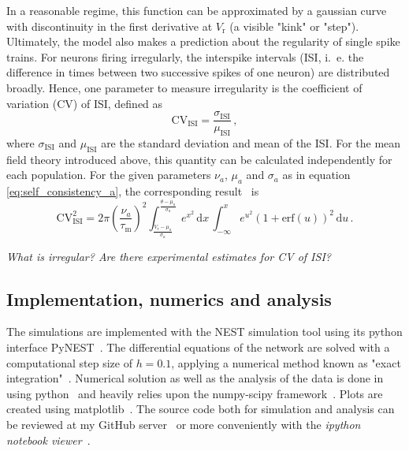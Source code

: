 In a reasonable regime, this function can be approximated by a gaussian curve with discontinuity in the first 
derivative at $V_\text{r}$ (a visible "kink" or "step").
Ultimately, the model also makes a prediction about the regularity of single spike 
trains. For neurons firing irregularly, the interspike intervals
(ISI, i.~e. the difference in times between two successive spikes of one neuron) 
are distributed broadly. Hence, one parameter to measure irregularity is the coefficient 
of variation (CV) of ISI, defined as
\begin{equation}
    \text{CV}_\text{ISI} = \frac{\sigma_\text{ISI}}{\mu_\text{ISI}} \,,
    \label{eq:cv_isi}
\end{equation}
where $\sigma_\text{ISI}$ and $\mu_\text{ISI}$ are the standard deviation and mean of 
the ISI. For the mean field theory introduced above, this quantity can be calculated
independently for each population. For the given parameters $\nu_a$, $\mu_a$ and 
$\sigma_a$ as in equation \eqref{eq:self_consistency_a}, the corresponding 
result~\cite{brunel2000} is
\begin{equation}
    \text{CV}_\text{ISI}^2 
        = 2 \pi \left(\frac{\nu_a}{\tau_\text{m}}\right)^2
            \int_{\frac{V_\text{r} - \mu_{a}}{\sigma_{a}}}^{\frac{\theta - \mu_{a}}{\sigma_{a}}} 
            e^{x^2}  \,\text{d}x  \,
            \int_{-\infty}^{x} 
            e^{u^2} \left(1 + \text{erf}(u)\right)^2 \,\text{d}u  \,.
    \label{eq:CV_ISI_mf}
\end{equation}

\emph{What is irregular? Are there experimental estimates for CV of ISI?}



 
\subsection{Implementation, numerics and analysis}
\label{subsec:analysis}
The simulations are implemented with the NEST simulation tool using its python interface
PyNEST~\cite{NEST}. The differential equations of the network are solved with a computational 
step size of $h=0.1$, applying a numerical method known as "exact integration"~\cite{rotter1999exact}.
Numerical solution as well as the analysis of the data is done in using 
python~\cite{python} and heavily relies upon the numpy-scipy framework~\cite{scipy}. 
Plots are created using matplotlib~\cite{matplotlib}.
The source code both for simulation and analysis can be reviewed at my
GitHub server~\cite{ba_github} or more conveniently with the 
\textit{ipython notebook viewer}~\cite{notebook_viewer}.

